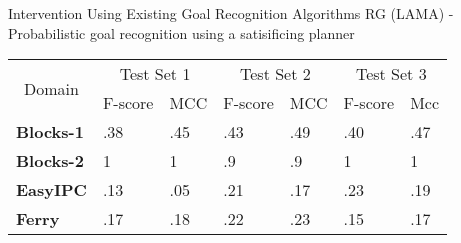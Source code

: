 \begin{frame} {Intervention Using Existing Goal Recognition Algorithms}
RG (LAMA) - Probabilistic goal recognition using a satisificing planner\\


\begin{table}[ptb]
\begin{tabular}{|l|ll|ll|ll|}
\hline
\multicolumn{1}{|c|}{\multirow{2}{*}{Domain}} & \multicolumn{2}{c|}{Test Set 1} & \multicolumn{2}{c|}{Test Set 2} & \multicolumn{2}{c|}{Test Set 3} \\ \cline{2-7} 
\multicolumn{1}{|c|}{} & \multicolumn{1}{c|}{F-score} & \multicolumn{1}{c|}{MCC} & \multicolumn{1}{c|}{F-score} & \multicolumn{1}{c|}{MCC} & \multicolumn{1}{c|}{F-score} & \multicolumn{1}{c|}{Mcc} \\ \hline
\textbf{Blocks-1} & .38 & .45 & .43 & .49 & .40 & .47 \\ \cline{1-1}
\textbf{Blocks-2} & 1 & 1 & .9 & .9 & 1 & 1 \\ \cline{1-1}
\textbf{EasyIPC} & .13 & .05 & .21 & .17 & .23 & .19 \\ \cline{1-1}
\textbf{Ferry} & .17 & .18 & .22 & .23 & .15 & .17 \\ \hline
\end{tabular}
\end{table}
\end{frame}